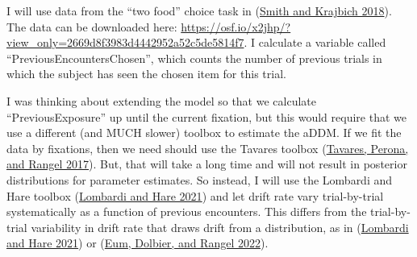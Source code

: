 \documentclass[
]{book}
\begin{document}
I will use data from the ``two food'' choice task in (\protect\hyperlink{ref-smith2018}{Smith and Krajbich 2018}). The data can be downloaded here: \url{https://osf.io/x2jhp/?view_only=2669d8f3983d4442952a52c5de5814f7}. I calculate a variable called ``PreviousEncountersChosen'', which counts the number of previous trials in which the subject has seen the chosen item for this trial.

I was thinking about extending the model so that we calculate ``PreviousExposure'' up until the current fixation, but this would require that we use a different (and MUCH slower) toolbox to estimate the aDDM. If we fit the data by fixations, then we need should use the Tavares toolbox (\protect\hyperlink{ref-tavares2017}{Tavares, Perona, and Rangel 2017}). But, that will take a long time and will not result in posterior distributions for parameter estimates. So instead, I will use the Lombardi and Hare toolbox (\protect\hyperlink{ref-lombardi2021}{Lombardi and Hare 2021}) and let drift rate vary trial-by-trial systematically as a function of previous encounters. This differs from the trial-by-trial variability in drift rate that draws drift from a distribution, as in (\protect\hyperlink{ref-lombardi2021}{Lombardi and Hare 2021}) or (\protect\hyperlink{ref-eum2022}{Eum, Dolbier, and Rangel 2022}).
\end{document}
